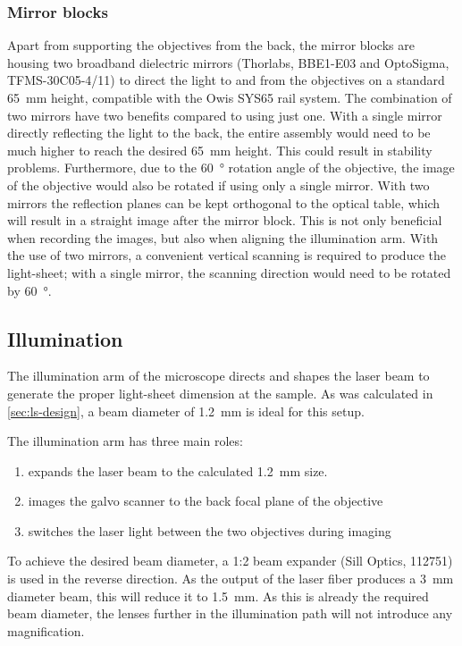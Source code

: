     \subsubsection{Mirror blocks}
    \label{sec:mirrors}
    Apart from supporting the objectives from the back, the mirror blocks are housing two broadband dielectric mirrors (Thorlabs, BBE1-E03 and OptoSigma, TFMS-30C05-4/11) to direct the light to and from the objectives on a standard \SI{65}{mm} height, compatible with the Owis SYS65 rail system. The combination of two mirrors have two benefits compared to using just one. With a single mirror directly reflecting the light to the back, the entire assembly would need to be much higher to reach the desired \SI{65}{mm} height. This could result in stability problems. Furthermore, due to the \SI{60}{\degree} rotation angle of the objective, the image of the objective would also be rotated if using only a single mirror. With two mirrors the reflection planes can be kept orthogonal to the optical table, which will result in a straight image after the mirror block. This is not only beneficial when recording the images, but also when aligning the illumination arm. With the use of two mirrors, a convenient vertical scanning is required to produce the light-sheet; with a single mirror, the scanning direction would need to be rotated by \SI{60}{\degree}.


  
    \subsection{Illumination}

    The illumination arm of the microscope directs and shapes the laser beam to generate the proper light-sheet dimension at the sample. As was calculated in \autoref{sec:ls-design}, a beam diameter of \SI{1.2}{mm} is ideal for this setup.

    The illumination arm has three main roles:
    \begin{enumerate}
      \item expands the laser beam to the calculated \SI{1.2}{mm} size.
      \item images the galvo scanner to the back focal plane of the objective
      \item switches the laser light between the two objectives during imaging
    \end{enumerate}

    To achieve the desired beam diameter, a 1:2 beam expander (Sill Optics, 112751) is used in the reverse direction. As the output of the laser fiber produces a \SI{3}{mm} diameter beam, this will reduce it to \SI{1.5}{mm}. As this is already the required beam diameter, the lenses further in the illumination path will not introduce any magnification.
    
